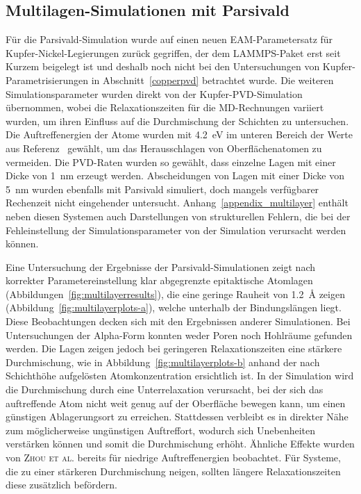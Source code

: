\subsection{Multilagen-Simulationen mit Parsivald}

Für die Parsivald-Simulation wurde auf einen neuen EAM-Parametersatz für Kupfer-Nickel-Legierungen zurück gegriffen\cite{onat_optimized_2014}, der dem LAMMPS-Paket erst seit Kurzem beigelegt ist und deshalb noch nicht bei den Untersuchungen von Kupfer-Parametrisierungen in Abschnitt~\ref{copperpvd} betrachtet wurde.
Die weiteren Simulationsparameter wurden direkt von der Kupfer-PVD-Simu\-la\-tion übernommen, wobei die Relaxationszeiten für die MD-Rechnungen variiert wurden, um ihren Einfluss auf die Durchmischung der Schichten zu untersuchen.
Die Auftreffenergien der Atome wurden mit \SI{4.2}{\electronvolt} im unteren Bereich der Werte aus Referenz~\cite{zhou_atomistic_1998} gewählt, um das Herausschlagen von Oberflächenatomen zu vermeiden.
Die PVD-Raten wurden so gewählt, dass einzelne Lagen mit einer Dicke von \SI{1}{\nano\meter} erzeugt werden.
Abscheidungen von Lagen mit einer Dicke von \SI{5}{\nano\meter} wurden ebenfalls mit Parsivald simuliert, doch mangels verfügbarer Rechenzeit nicht eingehender untersucht.
Anhang~\ref{appendix_multilayer} enthält neben diesen Systemen auch Darstellungen von strukturellen Fehlern, die bei der Fehleinstellung der Simulationsparameter von der Simulation verursacht werden können.

Eine Untersuchung der Ergebnisse der Parsivald-Simulationen zeigt nach korrekter Parametereinstellung klar abgegrenzte epitaktische Atomlagen (Abbildungen~\ref{fig:multilayerresults}), die eine geringe Rauheit von \SI{1.2}{\angstrom} zeigen (Abbildung~\ref{fig:multilayerplots-a}), welche unterhalb der Bindungslängen liegt.
Diese Beobachtungen decken sich mit den Ergebnissen anderer Simulationen\cite{zhou_atomic_2001,zhou_atomistic_1998}.
Bei Untersuchungen der Alpha-Form konnten weder Poren noch Hohlräume gefunden werden.
Die Lagen zeigen jedoch bei geringeren Relaxationszeiten eine stärkere Durchmischung, wie in Abbildung~\ref{fig:multilayerplots-b} anhand der nach Schichthöhe aufgelösten Atomkonzentration ersichtlich ist.
In der Simulation wird die Durchmischung durch eine Unterrelaxation verursacht, bei der sich das auftreffende Atom nicht weit genug auf der Oberfläche bewegen kann, um einen günstigen Ablagerungsort zu erreichen.
Stattdessen verbleibt es in direkter Nähe zum möglicherweise ungünstigen Auftreffort, wodurch sich Unebenheiten verstärken können und somit die Durchmischung erhöht.
Ähnliche Effekte wurden von \textsc{Zhou et al.}\cite{zhou_atomistic_1998} bereits für niedrige Auftreffenergien beobachtet.
Für Systeme, die zu einer stärkeren Durchmischung neigen, sollten längere Relaxationszeiten diese zusätzlich befördern.

